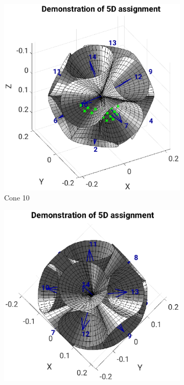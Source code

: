 \begin{figure}[H]
     \centering
     \begin{subfigure}[b]{0.49\textwidth}
         \centering
        \includegraphics[width=1.3\linewidth]{Graphics/Results/4d_5d/5thDim_over_4thDim_150_150_150_cones_10_center.eps}
         \caption{Cone 10}
         \label{fig:res:5th_4th_cones10}
     \end{subfigure}
     \hfill
     \begin{subfigure}[b]{0.49\textwidth}
         \centering
         \includegraphics[width=1.3\textwidth]{Graphics/Results/4d_5d/5thDim_over_4thDim_150_150_150_cones_14_center.eps}

\end{subfigure}
\end{figure}
